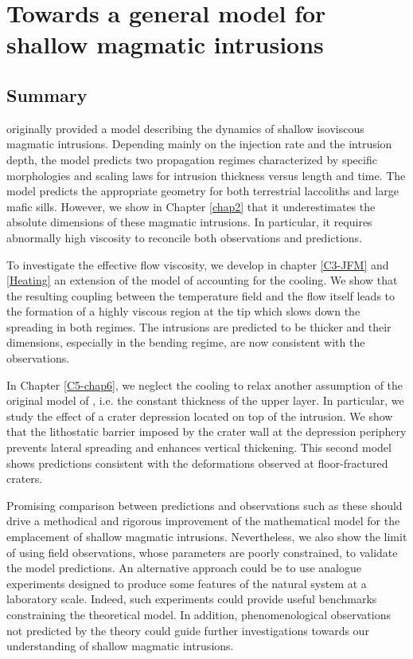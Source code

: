 \chapter[Towards a  model for  shallow magmatic  intrusions]{Towards a
  general model for shallow magmatic intrusions}
\label{chap7}
\minitoc

\section{Summary}
\label{C7-sec:summary-2}

\citet{Michaut:2011kg}  originally  provided  a model  describing  the
dynamics of shallow isoviscous  magmatic intrusions.  Depending mainly
on the injection rate and the  intrusion depth, the model predicts two
propagation regimes characterized by specific morphologies and scaling
laws  for  intrusion thickness  versus  length  and time.   The  model
predicts the appropriate geometry  for both terrestrial laccoliths and
large mafic  sills. However,  we show in  Chapter \ref{chap2}  that it
underestimates   the    absolute   dimensions   of    these   magmatic
intrusions. In  particular, it  requires abnormally high  viscosity to
reconcile both observations and predictions.

To investigate  the effective  flow viscosity,  we develop  in chapter
\ref{C3-JFM}  and   \ref{Heating}  an   extension  of  the   model  of
\citet{Michaut:2011kg} accounting  for the cooling.  We  show that the
resulting coupling between  the temperature field and  the flow itself
leads to  the formation of  a highly viscous  region at the  tip which
slows  down  the  spreading  in  both  regimes.   The  intrusions  are
predicted  to  be thicker  and  their  dimensions, especially  in  the
bending regime, are now consistent with the observations.

In Chapter  \ref{C5-chap6}, we  neglect the  cooling to  relax another
assumption of  the original model of  \citet{Michaut:2011kg}, i.e. the
constant thickness  of the  upper layer. In  particular, we  study the
effect of a crater depression located on top of the intrusion. We show
that  the  lithostatic barrier  imposed  by  the  crater wall  at  the
depression periphery prevents lateral  spreading and enhances vertical
thickening. This second model shows predictions consistent with
the deformations observed at floor-fractured craters.

Promising  comparison between  predictions  and  observations such  as
these  should  drive a  methodical  and  rigorous improvement  of  the
mathematical model for the emplacement of shallow magmatic intrusions.
Nevertheless,  we also  show the  limit of  using field  observations,
whose  parameters  are  poorly  constrained,  to  validate  the  model
predictions.   An  alternative  approach  could  be  to  use  analogue
experiments designed to produce some  features of the natural system at
a  laboratory scale.   Indeed, such  experiments could  provide useful
benchmarks   constraining  the   theoretical   model.   In   addition,
phenomenological observations not predicted  by the theory could guide
further investigations  towards our understanding of  shallow magmatic
intrusions.

